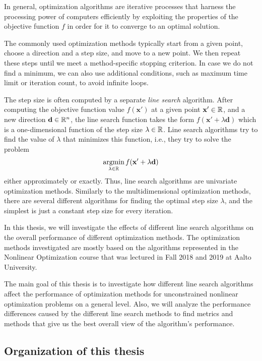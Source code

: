 \documentclass[english, 12pt, a4paper, sci, utf8, a-1b, online, table]{aaltothesis}
\newcommand{\vect}[1]{\ensuremath{\mathbf{#1}}}
\newcommand{\R}{\ensuremath\mathbb{R}}
\begin{document}
In general, optimization algorithms are iterative processes that harness the processing power of computers efficiently by exploiting the properties of the objective function $f$ in order for it to converge to an optimal solution.

The commonly used optimization methods typically start from a given point, choose a direction and a step size, and move to a new point. We then repeat these steps until we meet a method-specific stopping criterion. In case we do not find a minimum, we can also use additional conditions, such as maximum time limit or iteration count, to avoid infinite loops.

The step size is often computed by a separate \emph{line search} algorithm. After computing the objective function value $f(\vect{x}')$ at a given point $\vect{x}'\in \R$, and a new direction $\vect{d}\in \R^n$, the line search function takes the form $f(\vect{x}' + \lambda \vect{d})$ which is a one-dimensional function of the step size $\lambda\in \R$. Line search algorithms try to find the value of $\lambda$ that minimizes this function, i.e., they try to solve the problem
\begin{equation}\label{eq:ls}
\mathop{\text{argmin}}_{\lambda\in \R} f(\vect{x}' + \lambda \vect{d})
\end{equation}
either approximately or exactly. Thus, line search algorithms are univariate optimization methods. Similarly to the multidimensional optimization methods, there are several different algorithms for finding the optimal step size $\lambda$, and the simplest is just a constant step size for every iteration. 

In this thesis, we will investigate the effects of different line search algorithms on the overall performance of different optimization methods. The optimization methods investigated are mostly based on the algorithms represented in the Nonlinear Optimization course that was lectured in Fall 2018 and 2019 at Aalto University.

The main goal of this thesis is to investigate how different line search algorithms affect the performance of optimization methods for unconstrained nonlinear optimization problems on a general level. Also, we will analyze the performance differences caused by the different line search methods to find metrics and methods that give us the best overall view of the algorithm's performance.

\subsection{Organization of this thesis}
\end{document}
